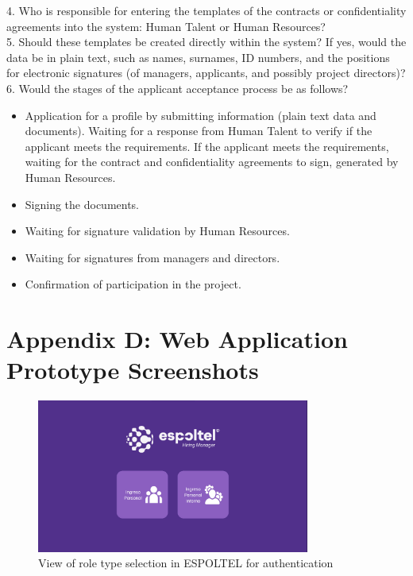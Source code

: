 \documentclass{scrreprt}
\begin{document}
4. Who is responsible for entering the templates of the contracts or confidentiality agreements into the system: Human Talent or Human Resources?\\

5. Should these templates be created directly within the system? If yes, would the data be in plain text, such as names, surnames, ID numbers, and the positions for electronic signatures (of managers, applicants, and possibly project directors)?\\

6. Would the stages of the applicant acceptance process be as follows?
\begin{itemize}
    \item Application for a profile by submitting information (plain text data and documents).
    Waiting for a response from Human Talent to verify if the applicant meets the requirements.
    If the applicant meets the requirements, waiting for the contract and confidentiality agreements to sign, generated by Human Resources.
    \item Signing the documents.
    \item  Waiting for signature validation by Human Resources.
    \item  Waiting for signatures from managers and directors.
    \item Confirmation of participation in the project.
\end{itemize}


\section{Appendix D: Web Application Prototype Screenshots}

\begin{figure}[H]
	\centering \small
	\includegraphics[width=0.8\textwidth]{WebPrototype/wflow-1.jpeg}
	\caption{View of role type selection in ESPOLTEL for authentication}
\end{figure}
\end{document}
